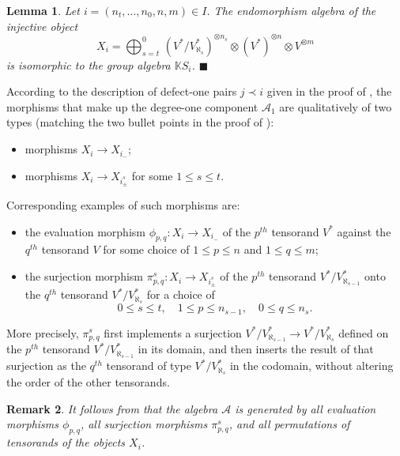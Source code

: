 \documentclass[11pt]{article}
\theoremstyle{plain}
\newtheorem{lemma}{Lemma}[section]
\theoremstyle{nonumberplain}
\theoremstyle{plain}
\newtheorem{remark}[lemma]{Remark}
\theoremstyle{nonumberplain}
\newcommand\bK{\mathbb K}
\newcommand\cA{\mathcal A}
\newcommand\al{\aleph}
\newcommand{\qedhere}{\mbox{}\hfill\ensuremath{\blacksquare}}
\begin{document}
\begin{lemma}\label{le.deg-0}
  Let $i=\left(n_t,\ldots,n_0,n,m\right)\in I$. The endomorphism algebra of the injective
  object 
  $$X_i=\bigoplus_{s=t}^0 \,\left(V^*/V^*_{\aleph_s}\right)^{\otimes n_s} \otimes \left(V^*\right)^{\otimes n}\otimes V^{\otimes m}$$ is isomorphic to the group algebra $\bK S_i$.  \qedhere
\end{lemma}




 According to the
description of defect-one pairs $j\prec i$ given in the proof of ,
the morphisms that make up the degree-one component $\cA_1$ are
qualitatively of two types (matching the two bullet points in the proof of
):

\begin{itemize}
  \item morphisms $X_i\to X_{i_-}$;
  \item morphisms $X_i\to X_{i^s_{\pm}}$ for some $1\le s\le t$.
\end{itemize}








Corresponding examples of such morphisms are:
\begin{itemize}
\item the evaluation morphism $\phi_{p,q}:X_i\to X_{i_-}$ of the
  $p^{th}$ tensorand  $V^*$  against the $q^{th}$ tensorand $V$ for
  some choice of $1\le p\le n$ and $1\le q\le m$;
\item the surjection morphism $\pi^s_{p,q}:X_i\to X_{i^s_{\pm}}$ of the
  $p^{th}$  tensorand $V^*/V^*_{\al_{s-1}}$ onto the $q^{th}$ tensorand
  $V^*/V^*_{\al_{s}}$ for a choice of
  \begin{equation*}
    0\le s\le t,\quad 1\le p\le n_{s-1},\quad 0\le q\le n_{s}. 
  \end{equation*}
\end{itemize}
More precisely, $\pi^s_{p,q}$ first implements a surjection
$V^*/V^*_{\al_{s-1}}\to V^*/V^*_{\al_{s}}$ defined on the $p^{th}$
tensorand $V^*/V^*_{\al_{s-1}}$ in its domain, and then inserts the
result of that surjection as the $q^{th}$ tensorand of type
$V^*/V^*_{\al_{s}}$ in the codomain, without altering the order of the
other tensorands.


\begin{remark}\label{re.full}
  It follows from \cite[Lemma 2.19]{us} that the algebra $\mathcal{A}$ is generated by all evaluation morphisms $\phi_{p,q}$, all surjection morphisms $\pi^s_{p,q}$, and all permutations of tensorands of the objects $X_i$.
\end{remark}
\end{document}
